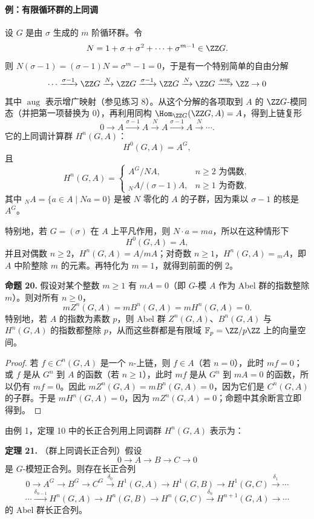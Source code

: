 \paragraph{例：有限循环群的上同调}
设 $G$ 是由 $\sigma$ 生成的 $m$ 阶循环群。令
\[
  N=1+\sigma+\sigma^2+\cdots+\sigma^{m-1}\in\ZZ G.
\]
则 $N(\sigma-1)=(\sigma-1)N=\sigma^m-1=0$，于是有一个特别简单的自由分解
\[
  \cdots\xrightarrow{\sigma-1}\ZZ G\xrightarrow{N}\ZZ G\xrightarrow{\sigma-1}\ZZ G\xrightarrow{N}\ZZ G\xrightarrow{\operatorname{aug}}\ZZ\to0
\]
其中 $\operatorname{aug}$ 表示增广映射（参见练习 8）。从这个分解的各项取到 $A$ 的 $\ZZ G$-模同态（并把第一项替换为 $0$），再利用同构 $\Hom_{
\ZZ G}(\ZZ G,A)=A$，得到上链复形
\[
  0\to A\xrightarrow{\sigma-1}A\xrightarrow{N}A\xrightarrow{\sigma-1}A\xrightarrow{N}\cdots .
\]
它的上同调计算群 $H^n(G,A)$：
\[
  H^0(G,A)=A^G,
\]
且
\[
H^n(G,A)=
\begin{cases}
A^G/NA,& n\geq2\text{ 为偶数},\\
{}_NA/(\sigma-1)A,& n\geq1\text{ 为奇数},
\end{cases}
\]
其中 ${}_NA=\{a\in A\mid Na=0\}$ 是被 $N$ 零化的 $A$ 的子群，因为乘以 $\sigma-1$ 的核是 $A^G$。

特别地，若 $G=(\sigma)$ 在 $A$ 上平凡作用，则 $N\cdot a=ma$，所以在这种情形下
\[
  H^0(G,A)=A,
\]
并且对偶数 $n\geq2$，$H^n(G,A)=A/mA$；对奇数 $n\geq1$，$H^n(G,A)={}_mA$，即 $A$ 中阶整除 $m$ 的元素。再特化为 $m=1$，就得到前面的例 2。

\medskip
\noindent\textbf{命题 20.} 假设对某个整数 $m\geq1$ 有 $mA=0$（即 $G$-模 $A$ 作为 Abel 群的指数整除 $m$）。则对所有 $n\geq0$，
\[
  mZ^n(G,A)=mB^n(G,A)=mH^n(G,A)=0.
\]
特别地，若 $A$ 的指数为素数 $p$，则 Abel 群 $Z^n(G,A)$、$B^n(G,A)$ 与 $H^n(G,A)$ 的指数都整除 $p$，从而这些群都是有限域 $\mathbb F_p=\ZZ/p\ZZ$ 上的向量空间。

\begin{proof}
若 $f\in C^n(G,A)$ 是一个 $n$-上链，则 $f\in A$（若 $n=0$），此时 $mf=0$；或 $f$ 是从 $G^n$ 到 $A$ 的函数（若 $n\geq1$），此时 $mf$ 是从 $G^n$ 到 $mA=0$ 的函数，所以仍有 $mf=0$。因此 $mZ^n(G,A)=mB^n(G,A)=0$，因为它们是 $C^n(G,A)$ 的子群。于是 $mH^n(G,A)=0$，因为 $mZ^n(G,A)=0$；命题中其余断言立即得到。
\end{proof}

由例 1，定理 10 中的长正合列用上同调群 $H^n(G,A)$ 表示为：

\medskip
\noindent\textbf{定理 21.} （群上同调长正合列）假设
\[
  0\to A\to B\to C\to0
\]
是 $G$-模短正合列。则存在长正合列
\[
0\to A^G\to B^G\to C^G\xrightarrow{\delta_0}H^1(G,A)\to H^1(G,B)\to H^1(G,C)\xrightarrow{\delta_1}\cdots
\]
\[
\cdots\xrightarrow{\delta_{n-1}}H^n(G,A)\to H^n(G,B)\to H^n(G,C)\xrightarrow{\delta_n}H^{n+1}(G,A)\to\cdots
\]
的 Abel 群长正合列。

